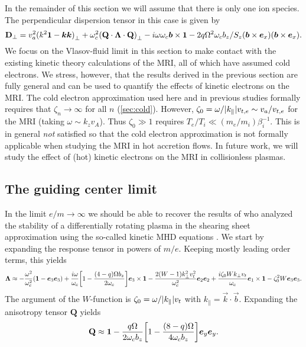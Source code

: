 \documentclass[aps,pre,notitlepage,amsmath,amssymb,amsfonts,nobibnotes,nofootinbib,superscriptaddress]{revtex4-1}
\begin{document}
In the remainder of this section we will assume that there is only one ion
species. The perpendicular dispersion tensor in this case is given by
\begin{equation}
  \label{eq:perpendicular-dispersion-single}
  \mathbf{D}_\perp =
  \va^2{(k^2\mathbf{1} - \vec{k}\vec{k})}_\perp
  + \omc^2{(\mathbf{Q}\cdot\mathbf{\Lambda}\cdot\mathbf{Q})}_\perp
  - i\omega\omc\vec{b}\times\mathbf{1}
  - 2q\Omega^2\omc b_z/S_z
  (\vec{b}\times\ex)(\vec{b}\times\ex).
\end{equation}
We focus on the Vlasov-fluid limit in this section to make contact with the
existing kinetic theory calculations of the MRI, all of which have assumed
cold electrons. We stress, however, that the results derived in the previous
section are fully general and can be used to quantify the effects of kinetic
electrons on the MRI\@. The cold electron approximation used here and in
previous studies formally requires that $\zeta_n\rightarrow\infty$ for all $n$
(\cref{sec:cold}). However,
$\zeta_0=\omega/|k_\parallel|v_{t,e}\sim{}v_a/v_{t,e}$ for the MRI (taking
$\omega\sim{}k_z{}v_A$). Thus $\zeta_0\gg{}1$ requires
$T_e/T_i\ll(m_e/m_i)\beta_i^{-1}$. This is in general \emph{not} satisfied so
that the cold electron approximation is not formally applicable when studying
the MRI in hot accretion flows. In future work, we will study the effect of
(hot) kinetic electrons on the MRI in collisionless plasmas.

\subsection{The guiding center limit}
\label{sec:guiding-center}

In the limit $e/m\to\infty$ we should be able to recover the results of
\citet{Quataert2002} who analyzed the stability of a differentially rotating
plasma in the shearing sheet approximation using the so-called kinetic MHD
equations \citep{Grad1961,Kulsrud1983,Hazeltine2004}. We start by expanding
the response tensor in powers of $m/e$. Keeping mostly leading order terms,
this yields
\begin{equation}
  \mathbf{\Lambda} \approx
  -\frac{\omega^2}{\omc^2}(\mathbf{1} - \vec{e}_3\vec{e}_3)
  + \frac{i\omega}{\omc}\left[1 - \frac{(4-q)\Omega b_z}{2\omc}\right]
  \vec{e}_3\times\mathbf{1}
  - \frac{2(W-1)k_\perp^2\vt^2}{\omc^2}\vec{e}_2\vec{e}_2
  + \frac{i\zeta_0 Wk_\perp\vt}{\omc}\vec{e}_1\times\mathbf{1}
  - \zeta_0^2 W\vec{e}_3\vec{e}_3.
\end{equation}
The argument of the $W$-function is $\zeta_0=\omega/|k_\parallel|v_t$ with
$k_\parallel=\vec{k}\cdot\vec{b}$. Expanding the anisotropy tensor
$\mathbf{Q}$ yields
\begin{equation}
  \mathbf{Q} \approx \mathbf{1} - \frac{q\Omega}{2\omc b_z}
  \left[1 - \frac{(8-q)\Omega}{4\omc b_z}\right]\ey\ey.
\end{equation}
\end{document}
